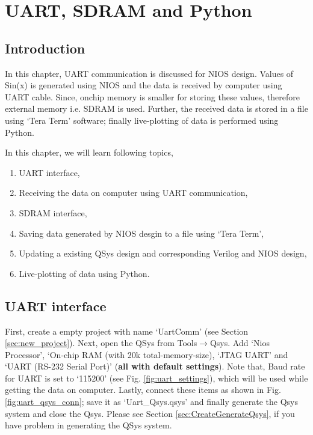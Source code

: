 \chapter{UART, SDRAM and Python} \label{ch:UartSdramPython}

\graphicspath{{Chapters/UartSdramPython/Figures/}}


\section{Introduction}
In this chapter, UART communication is discussed for NIOS design. Values of Sin(x) is generated using NIOS and the data is  received by computer using UART cable. Since, onchip memory is smaller for storing these values, therefore external memory i.e. SDRAM is used. Further, the received data is stored in a file using `Tera Term' software; finally live-plotting of data is performed using Python.  

In this chapter, we will learn following topics, 
\begin{enumerate}
	\item UART interface,
	\item Receiving the data on computer using UART communication,
	\item SDRAM interface,
	\item Saving data generated by NIOS desgin to a file using `Tera Term',
	\item Updating a existing QSys design and corresponding Verilog and NIOS design,
	\item Live-plotting of data using Python. 
\end{enumerate}

\section{UART interface}
First, create a empty project with name `UartComm' (see Section \ref{sec:new_project}). Next, open the QSys from Tools$\rightarrow$Qsys. Add `Nios Processor', `On-chip RAM (with 20k total-memory-size), `JTAG UART' and `UART (RS-232 Serial Port)' (\textbf{all with default settings}). Note that, Baud rate for UART is set to `115200' (see Fig. \ref{fig:uart_settings}), which will be used while getting the data on computer. Lastly, connect these items as shown in Fig. \ref{fig:uart_qsys_conn}; save it as `Uart\_Qsys.qsys' and finally generate the Qsys system and close the Qsys. Please see Section \ref{sec:CreateGenerateQsys}, if you have problem in generating the QSys system.

